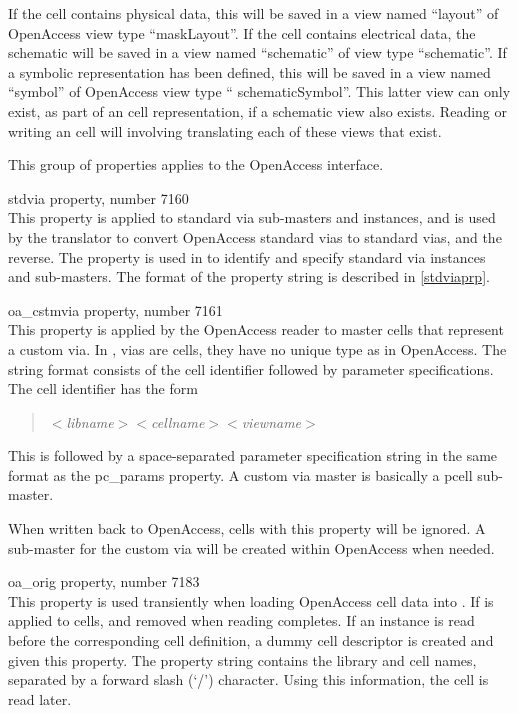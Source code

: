 If the cell contains physical data, this will be saved in a view named
``{\vt layout}'' of OpenAccess view type ``{\vt maskLayout}''.  If the
cell contains electrical data, the schematic will be saved in a view
named ``{\vt schematic}'' of view type ``{\vt schematic}''.  If a
symbolic representation has been defined, this will be saved in a view
named ``{\vt symbol}'' of OpenAccess view type ``{\vt
schematicSymbol}''.  This latter view can only exist, as part of an
{\Xic} cell representation, if a schematic view also exists.  Reading
or writing an {\Xic} cell will involving translating each of these
views that exist.

This group of properties applies to the OpenAccess interface.

\begin{description}
\item{\et stdvia} property, number 7160\\
This property is applied to standard via sub-masters and instances,
and is used by the translator to convert OpenAccess standard vias to
{\Xic} standard vias, and the reverse.  The property is used in {\Xic}
to identify and specify standard via instances and sub-masters.  The
format of the property string is described in \ref{stdviaprp}.

\item{\et oa\_cstmvia} property, number 7161\\
This property is applied by the OpenAccess reader to master cells that
represent a custom via.  In {\Xic}, vias are cells, they have no
unique type as in OpenAccess.  The string format consists of the cell
identifier followed by parameter specifications.  The cell identifier
has the form
\begin{quote}
$<${\it libname\/}$><${\it cellname\/}$><${\it viewname\/}$>$
\end{quote}
This is followed by a space-separated parameter specification string
in the same format as the {\et pc\_params} property.  A custom via
master is basically a pcell sub-master.

When written back to OpenAccess, cells with this property will be
ignored.  A sub-master for the custom via will be created within
OpenAccess when needed.

\item{\et oa\_orig} property, number 7183\\
This property is used transiently when loading OpenAccess cell data
into {\Xic}.  If is applied to cells, and removed when reading
completes.  If an instance is read before the corresponding cell
definition, a dummy {\Xic} cell descriptor is created and given this
property.  The property string contains the library and cell names,
separated by a forward slash (`{\vt /}') character.  Using this
information, the cell is read later.
\end{description}

